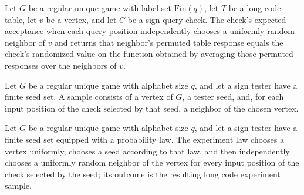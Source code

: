 \begin{theorem}
\label{FABL.RegularUniqueGame.operationalCheckValue_eq_randomizedValue}
\leanok
{}
Let $G$ be a regular unique game with label set $\text{Fin}(q)$, let $T$ be a long-code
table, let $v$ be a vertex, and let $C$ be a sign-query check. The check's expected
acceptance when each query position independently chooses a uniformly random neighbor of
$v$ and returns that neighbor's permuted table response equals the check's randomized
value on the function obtained by averaging those permuted responses over the neighbors
of $v$.
\end{theorem}

\begin{definition}
\label{FABL.RegularUniqueGame.LongCodeExperimentSample}
\leanok
{}
Let $G$ be a regular unique game with alphabet size $q$, and let a sign tester have a
finite seed set. A sample consists of a vertex of $G$, a tester seed, and, for each
input position of the check selected by that seed, a neighbor of the chosen vertex.
\end{definition}

\begin{definition}
\label{FABL.RegularUniqueGame.longCodeExperimentLaw}
\leanok
{}
Let $G$ be a regular unique game with alphabet size $q$, and let a sign tester have a
finite seed set equipped with a probability law. The experiment law chooses a vertex
uniformly, chooses a seed according to that law, and then independently chooses a
uniformly random neighbor of the vertex for every input position of the check selected
by the seed; its outcome is the resulting long code experiment sample.
\end{definition}

